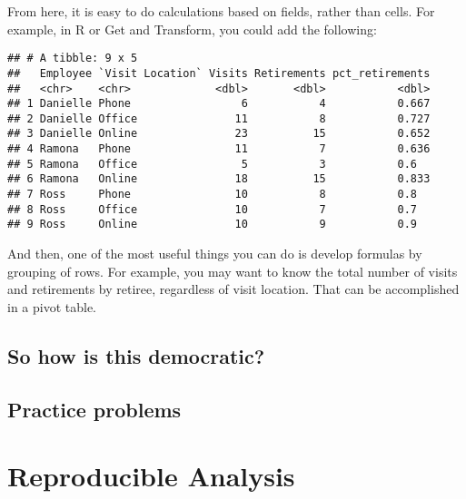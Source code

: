 \documentclass[]{book}
\newenvironment{Shaded}{\begin{snugshade}}{\end{snugshade}}
\newcommand{\DataTypeTok}[1]{\textcolor[rgb]{0.13,0.29,0.53}{#1}}
\newcommand{\KeywordTok}[1]{\textcolor[rgb]{0.13,0.29,0.53}{\textbf{#1}}}
\newcommand{\NormalTok}[1]{#1}
\newcommand{\OperatorTok}[1]{\textcolor[rgb]{0.81,0.36,0.00}{\textbf{#1}}}
\newcommand{\StringTok}[1]{\textcolor[rgb]{0.31,0.60,0.02}{#1}}
\begin{document}
From here, it is easy to do calculations based on fields, rather than cells. For example, in R or Get and Transform, you could add the following:

\begin{Shaded}
\end{Shaded}

\begin{verbatim}
## # A tibble: 9 x 5
##   Employee `Visit Location` Visits Retirements pct_retirements
##   <chr>    <chr>             <dbl>       <dbl>           <dbl>
## 1 Danielle Phone                 6           4           0.667
## 2 Danielle Office               11           8           0.727
## 3 Danielle Online               23          15           0.652
## 4 Ramona   Phone                11           7           0.636
## 5 Ramona   Office                5           3           0.6  
## 6 Ramona   Online               18          15           0.833
## 7 Ross     Phone                10           8           0.8  
## 8 Ross     Office               10           7           0.7  
## 9 Ross     Online               10           9           0.9
\end{verbatim}

And then, one of the most useful things you can do is develop formulas by grouping of rows. For example, you may want to know the total number of visits and retirements by retiree, regardless of visit location. That can be accomplished in a pivot table.

\hypertarget{so-how-is-this-democratic}{%
\section{So how is this democratic?}\label{so-how-is-this-democratic}}

\hypertarget{practice-problems}{%
\section{Practice problems}\label{practice-problems}}

\hypertarget{reproducible-analysis}{%
\chapter{Reproducible Analysis}\label{reproducible-analysis}}
\end{document}
